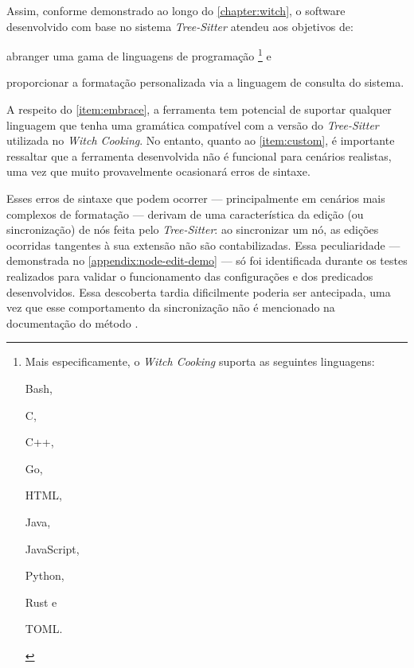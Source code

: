 \documentclass
  [11pt,a4paper,english,brazil,openright,sumario=tradicional,twoside]
  {abntex2}
\newcommand{\treesitter}{\textit{Tree-Sitter}\xspace}
\newcommand{\witchcooking}{\textit{Witch Cooking}\xspace}
\begin{document}
  Assim, conforme demonstrado ao longo do \cref{chapter:witch}, o software
  desenvolvido com base no sistema \treesitter atendeu
  aos objetivos de:
  \begin{inparaenum}
    \item \label{item:embrace} abranger uma gama de linguagens de programação%
          \footnote
            { Mais especificamente, o \witchcooking suporta as seguintes
              linguagens:
              \begin{inparaenum}[(I)]
                \item Bash,
                \item C,
                \item C++,
                \item Go,
                \item HTML,
                \item Java,
                \item JavaScript,
                \item Python,
                \item Rust e
                \item TOML.
              \end{inparaenum}}
          e
    \item \label{item:custom} proporcionar a formatação personalizada via a
          linguagem de consulta do sistema.
  \end{inparaenum}
  A respeito do \cref{item:embrace}, a ferramenta tem potencial de suportar
  qualquer linguagem que tenha uma gramática compatível com a versão do
  \treesitter utilizada no \witchcooking. No entanto, quanto ao
  \cref{item:custom}, é importante ressaltar que a ferramenta desenvolvida não
  é funcional para cenários realistas, uma vez que muito provavelmente
  ocasionará erros de sintaxe.

  Esses erros de sintaxe que podem ocorrer --- principalmente em cenários mais
  complexos de formatação --- derivam de uma característica da edição (ou
  sincronização) de nós feita pelo \treesitter: ao sincronizar um nó, as
  edições ocorridas tangentes à sua extensão não são contabilizadas. Essa
  peculiaridade --- demonstrada no \cref{appendix:node-edit-demo} --- só foi
  identificada durante os testes realizados para validar o funcionamento das
  configurações e dos predicados desenvolvidos. Essa descoberta tardia
  dificilmente poderia ser antecipada, uma vez que esse comportamento da
  sincronização não é mencionado na documentação do método
   \cite{tree-sitter-2023-node}.
\end{document}
